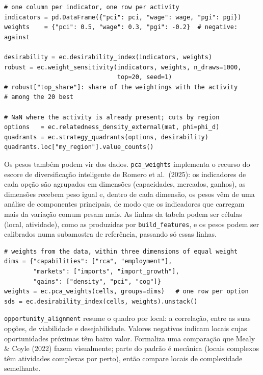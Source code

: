 \documentclass[12pt, a4paper]{article}
\newcommand{\fn}[1]{\texttt{#1}}
\begin{document}
\begin{lstlisting}[caption={Desejabilidade, sensibilidade aos pesos e quadrantes}]
# one column per indicator, one row per activity
indicators = pd.DataFrame({"pci": pci, "wage": wage, "pgi": pgi})
weights    = {"pci": 0.5, "wage": 0.3, "pgi": -0.2}  # negative: against

desirability = ec.desirability_index(indicators, weights)
robust = ec.weight_sensitivity(indicators, weights, n_draws=1000,
                               top=20, seed=1)
# robust["top_share"]: share of the weightings with the activity
# among the 20 best

# NaN where the activity is already present; cuts by region
options   = ec.relatedness_density_external(mat, phi=phi_d)
quadrants = ec.strategy_quadrants(options, desirability)
quadrants.loc["my_region"].value_counts()
\end{lstlisting}

\begin{sloppypar}
Os pesos tamb\'{e}m podem vir dos dados. \fn{pca\_weights} implementa o
recurso do escore de diversifica\c{c}\~{a}o inteligente de Romero et al.\
(2025): os indicadores de cada op\c{c}\~{a}o s\~{a}o agrupados em
dimens\~{o}es (capacidades, mercados, ganhos), as dimens\~{o}es recebem
peso igual e, dentro de cada dimens\~{a}o, os pesos v\^{e}m de uma an\'{a}lise
de componentes principais, de modo que os indicadores que carregam mais da
varia\c{c}\~{a}o comum pesam mais. As linhas da tabela podem ser c\'{e}lulas
(local, atividade), como as produzidas por \fn{build\_features}, e os
pesos podem ser calibrados numa subamostra de refer\^{e}ncia, passando s\'{o}
essas linhas.
\end{sloppypar}

\begin{lstlisting}[caption={Pesos por componentes principais (escore de diversifica\c{c}\~{a}o inteligente)}]
# weights from the data, within three dimensions of equal weight
dims = {"capabilities": ["rca", "employment"],
        "markets": ["imports", "import_growth"],
        "gains": ["density", "pci", "cog"]}
weights = ec.pca_weights(cells, groups=dims)   # one row per option
sds = ec.desirability_index(cells, weights).unstack()
\end{lstlisting}

\begin{sloppypar}
\fn{opportunity\_alignment} resume o quadro por local: a correla\c{c}\~{a}o,
entre as suas op\c{c}\~{o}es, de viabilidade e desejabilidade. Valores
negativos indicam locais cujas oportunidades pr\'{o}ximas t\^{e}m baixo
valor. Formaliza uma compara\c{c}\~{a}o que Mealy \& Coyle (2022) fazem
visualmente; parte do padr\~{a}o \'{e} mec\^{a}nica (locais complexos t\^{e}m
atividades complexas por perto), ent\~{a}o compare locais de complexidade
semelhante.
\end{sloppypar}
\end{document}
